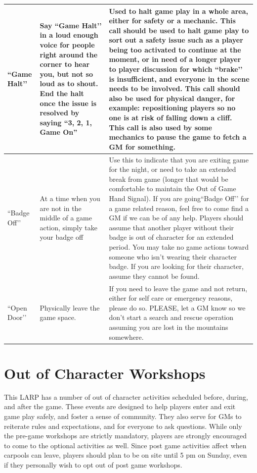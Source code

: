 \documentclass[sheet]{GL2020}
\begin{document}
\begin{tabularx}{\textwidth}{|>{\centering\arraybackslash} m{1.5cm} | >{\centering\arraybackslash} m{1.8cm} | >{\centering\arraybackslash}X |}
    \hline
``Game Halt’’ & Say ``Game Halt’’ in a loud enough voice for people right around the corner to hear you, but not so loud as to shout. End the halt once the issue is resolved by saying “3, 2, 1, Game On” &  Used to halt game play in a whole area, either for safety or a mechanic. This call should be used to halt game play to sort out a safety issue such as a player being too activated to continue at the moment, or in need of a longer player to player discussion for which ``brake’’ is insufficient, and everyone in the scene needs to be involved. This call should also be used for physical danger, for example: repositioning players so no one is at risk of falling down a cliff. This call is also used by some mechanics to pause the game to fetch a GM for something. \\
    \hline
``Badge Off’’ & At a time when you are not in the middle of a game action, simply take your badge off & Use this to indicate that you are exiting game for the night, or need to take an extended break from game (longer that would be comfortable to maintain the Out of Game Hand Signal). If you are going``Badge Off’’ for a game related reason, feel free to come find a GM if we can be of any help. Players should assume that another player without their badge is out of character for an extended period. You may take no game actions toward someone who isn’t wearing their character badge. If you are looking for their character, assume they cannot be found. \\
    \hline
``Open Door’’ & Physically leave the game space. & If you need to leave the game and not return, either for self care or emergency reasons, please do so. PLEASE, let a GM know so we don't start a search and rescue operation assuming you are lost in the mountains somewhere. \\
    \hline
\end{tabularx}

\section{Out of Character Workshops}
This LARP has a number of out of character activities scheduled before, during, and after the game. These events are designed to help players enter and exit game play safely, and foster a sense of community. They also serve for GMs to reiterate rules and expectations, and for everyone to ask questions. While only the pre-game workshops are strictly mandatory, players are strongly encouraged to come to the optional activities as well. Since post game activities affect when carpools can leave, players should plan to be on site until 5 pm on Sunday, even if they personally wish to opt out of post game workshops.
\end{document}
